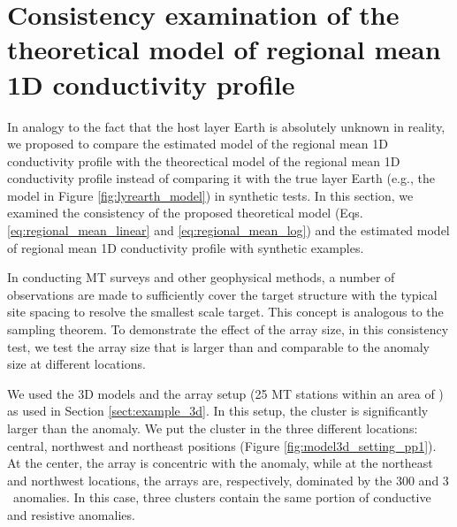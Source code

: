 
\renewcommand{\thisdir}{_content/reg1d_exam}
\renewcommand{\figdir}{\thisdir/_fig}

\section[Examination of theoretical definition]{Consistency examination of the theoretical model of regional mean 1D conductivity profile}\label{sect:reg1d_exam}

	In analogy to the fact that the host layer Earth is absolutely unknown in reality, we proposed to compare the estimated model of the regional mean 1D conductivity profile with the theorectical model of the regional mean 1D conductivity profile instead of comparing it with the true layer Earth (e.g., the model in Figure \ref{fig:lyrearth_model}) in synthetic tests.
	In this section, we examined the consistency of the proposed theoretical model (Eqs. \ref{eq:regional_mean_linear} and \ref{eq:regional_mean_log}) and the estimated model of regional mean 1D conductivity profile with synthetic examples.

In conducting MT surveys and other geophysical methods, 
a number of observations are made to sufficiently cover the target structure with the typical site spacing to resolve the smallest scale target.
%
This concept is analogous to the sampling theorem. 
%
To demonstrate the effect of the array size, in this consistency test, we test the array size that is larger than and comparable to the anomaly size at different locations.


We used the 3D models and the array setup (25 MT stations within an area of ) as used in Section \ref{sect:example_3d}. In this setup, the cluster is significantly larger than the anomaly.
We put the cluster in the three different locations: central, northwest and northeast positions (Figure \ref{fig:model3d_setting_pp1}). 
%
At the center, the array is concentric with the anomaly, while at the northeast and northwest locations, the arrays are, respectively, dominated by the 300 and 3 \Ohmm\ anomalies. In this case, three clusters contain the same portion of conductive and resistive anomalies.

